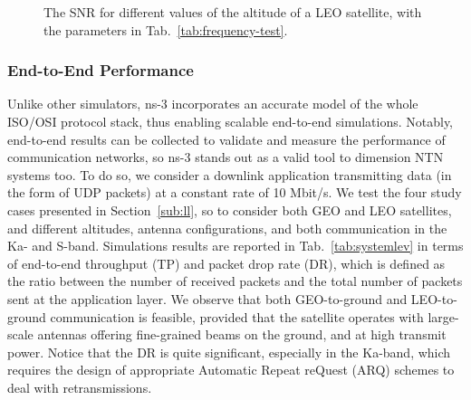 \begin{figure}[t]
    \centering 
    \setlength{}
    \setlength{}
    
    \caption{The SNR for different values of the altitude of a LEO satellite, with the parameters in Tab.~\ref{tab:frequency-test}.}
    \label{fig:altitude-test}
\end{figure}

\subsubsection{End-to-End Performance}
Unlike other simulators, ns-3 incorporates an accurate model of the whole ISO/OSI protocol stack, thus enabling scalable end-to-end simulations. Notably, end-to-end results can be collected to validate and measure the performance of communication networks, so ns-3 stands out as a valid tool to dimension NTN systems too.
To do so, we consider a downlink application transmitting data (in the form of UDP packets) at a constant rate of 10 Mbit/s. We test the four study cases presented in Section~\ref{sub:ll}, so to consider both GEO and LEO satellites, and different altitudes, antenna configurations, and both communication in the Ka- and S-band. 
Simulations results are reported in Tab.~\ref{tab:systemlev} in terms of end-to-end throughput (TP) and packet drop rate (DR), which is defined as the ratio between the number of received packets and the total number of packets sent at the application layer.
We observe that both GEO-to-ground and LEO-to-ground communication is feasible, provided that the satellite operates with large-scale antennas offering fine-grained beams on the ground, and at high transmit power. 
Notice that the DR is quite significant, especially in the Ka-band, which requires the design of appropriate Automatic Repeat reQuest (ARQ) schemes to deal with retransmissions.
